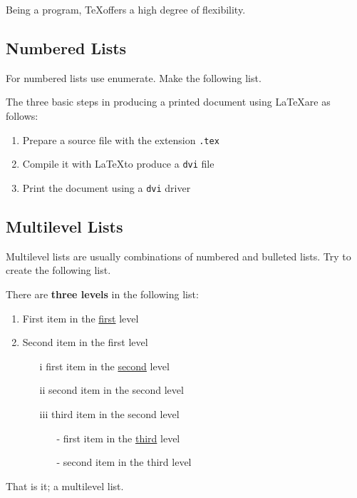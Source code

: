 \documentclass[a4paper,11pt]{article}
\begin{document}
Being a program, \TeX offers a high degree of flexibility.

\subsection{Numbered Lists}

For numbered lists use enumerate. Make the following list.

The three basic steps in producing a printed document using \LaTeX are as follows:

\begin{enumerate}

\item Prepare a source file with the extension \texttt{.tex}
\item Compile it with \LaTeX to produce a \texttt{dvi} file
\item Print the document using a \texttt{dvi} driver

\end{enumerate}

\subsection{Multilevel Lists}

Multilevel lists are usually combinations of numbered and bulleted lists. Try to create the following list.

There are \textbf{three levels} in the following list:

\begin{enumerate}

\item First item in the \underline{first} level
\item Second item in the first level
\begin{itemize}

\item[i] first item in the \underline{second} level
\item[ii] second item in the second level
\item[iii] third item in the second level

\begin{itemize}

\item[-] first item in the \underline{third} level
\item[-] second item in the third level

\end{itemize}

\end{itemize}

\end{enumerate}
That is it; a multilevel list.
\newpage
\end{document}
